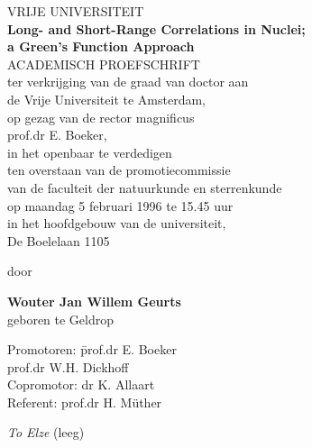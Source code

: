 \pagestyle {empty}
\begin{center}
VRIJE UNIVERSITEIT \\
\vspace*{2.0cm}
{\Large\bf Long- and Short-Range Correlations in Nuclei;} \\[.5\baselineskip]
{\Large\bf a Green's Function Approach} \\

\vspace*{2.0cm}
ACADEMISCH PROEFSCHRIFT \\
\vspace*{1.0cm}
ter verkrijging van de graad van doctor aan 		\\[.4\baselineskip]
de Vrije Universiteit te Amsterdam,			\\[.4\baselineskip]
op gezag van de rector magnificus			\\[.4\baselineskip]
prof.dr E. Boeker,					\\[.4\baselineskip]
in het openbaar te verdedigen				\\[.4\baselineskip]
ten overstaan van de promotiecommissie			\\[.4\baselineskip]
van de faculteit der natuurkunde en sterrenkunde 	\\[.4\baselineskip]
op maandag 5 februari 1996 te 15.45 uur 		\\[.4\baselineskip]
in het hoofdgebouw van de universiteit,			\\[.4\baselineskip]
De Boelelaan 1105 					\\[.4\baselineskip]
\vspace*{1.5cm}

door \\
\vspace*{1.0cm}

{\bf Wouter Jan Willem Geurts} \\
\vspace*{0.3cm}
geboren te Geldrop \\

\end{center}

\newpage

\noindent
{\large
\begin{tabbing}
Promotoren: \=  prof.dr E. Boeker \\
            \>  prof.dr W.H. Dickhoff \\
Copromotor: \>  dr K. Allaart\\
Referent: \>  prof.dr H. M\"uther\\
\end{tabbing}
}
\vfill

\newpage

\hbox{} \vfill 
{\hfill\em To Elze\hspace{2cm}}
\vspace{2cm}
\newpage
\hbox{(leeg)}
\newpage

\pagestyle{plain}
